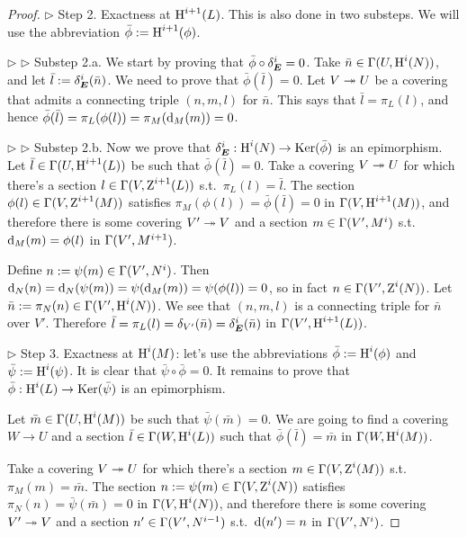 \begin{proof}
\medskip \noindent 
$\triangleright$ Step 2. Exactness at $\operatorname{H}^{i + 1}(L)$. This is also done 
in two substeps. We will use the abbreviation 
$\bar{\phi} := \operatorname{H}^{i + 1}(\phi)$. 

\medskip \noindent 
$\triangleright$  $\triangleright$  Substep 2.a.
We start by proving that 
$\bar{\phi} \circ \delta_{\boldsymbol{E}}^i  = 0$.
Take $\bar{n} \in \Gamma(U, \operatorname{H}^{i}(N))$, and let 
$\bar{l} := \delta_{\boldsymbol{E}}^i(\bar{n})$. We need to prove that 
$\bar{\phi}(\bar{l}) = 0$. 
Let $V \twoheadrightarrow U$ be a covering that admits a connecting triple $(n, m, l)$ for 
$\bar{n}$. This says that $\bar{l} = \pi_L(l)$, and hence 
$\bar{\phi}(\bar{l}) = \pi_L(\phi(l)) = \pi_M(\mathrm{d}_M(m)) = 0$.

\medskip \noindent 
$\triangleright$  $\triangleright$  Substep 2.b.
Now we prove that 
$\delta_{\boldsymbol{E}}^i : \operatorname{H}^{i}(N) \to \operatorname{Ker}(\bar{\phi})$
is an epimorphism. 
Let $\bar{l} \in \Gamma(U, \operatorname{H}^{i + 1}(L))$ be such that 
$\bar{\phi}(\bar{l}) = 0$. 
Take a covering $V \twoheadrightarrow U$ for which there's a section 
$l \in \Gamma(V, \operatorname{Z}^{i + 1}(L))$
s.t.\ $\pi_L(l) = \bar{l}$. The section 
$\phi(l) \in \Gamma(V, \operatorname{Z}^{i + 1}(M))$
satisfies 
$\pi_M(\phi(l)) = \bar{\phi}(\bar{l}) = 0$
in $\Gamma(V, \operatorname{H}^{i + 1}(M))$, and therefore there is some covering 
$V' \twoheadrightarrow V$ and a section 
$m \in \Gamma(V', M^{i})$ s.t.\ 
$\mathrm{d}_M(m) = \phi(l)$ in $\Gamma(V', M^{i + 1})$.

Define $n := \psi(m) \in \Gamma(V', N^{i})$. Then 
$\mathrm{d}_N(n) = \mathrm{d}_N(\psi(m)) = \psi(\mathrm{d}_M(m)) = \psi(\phi(l)) = 0$,
so in fact $n \in \Gamma(V', \operatorname{Z}^{i}(N))$. 
Let $\bar{n} := \pi_N(n) \in \Gamma(V', \operatorname{H}^{i}(N))$.
We see that $(n, m, l)$ is a connecting triple for $\bar{n}$ over $V'$. 
Therefore 
$\bar{l} = \pi_L(l) = \delta_{V'}(\bar{n}) = \delta_{\boldsymbol{E}}^i(\bar{n})$
in $\Gamma(V', \operatorname{H}^{i + 1}(L))$. 

\medskip \noindent 
$\triangleright$ Step 3. Exactness at $\operatorname{H}^{i}(M)$: 
let's use the abbreviations $\bar{\phi} := \operatorname{H}^{i}(\phi)$ and 
$\bar{\psi} := \operatorname{H}^{i}(\psi)$. 
It is clear that $\bar{\psi} \circ \bar{\phi} = 0$. 
It remains to prove that 
$\bar{\phi} : \operatorname{H}^{i}(L) \to \operatorname{Ker}(\bar{\psi})$
is an epimorphism. 

Let $\bar{m} \in \Gamma(U, \operatorname{H}^{i}(M))$ be such that 
$\bar{\psi}(\bar{m}) = 0$. 
We are going to find a covering $W \to U$ and a section 
$\bar{l} \in \Gamma(W, \operatorname{H}^{i}(L))$
such that $\bar{\phi}(\bar{l}) = \bar{m}$ in 
$\Gamma(W, \operatorname{H}^{i}(M))$.

Take a covering $V \twoheadrightarrow U$ for which there's a section 
$m \in \Gamma(V, \operatorname{Z}^{i}(M))$
s.t.\ $\pi_M(m) = \bar{m}$. 
The section $n := \psi(m) \in \Gamma(V, \operatorname{Z}^{i}(N))$
satisfies
$\pi_N(n) = \bar{\psi}(\bar{m}) = 0$
in $\Gamma(V, \operatorname{H}^{i}(N))$, and therefore there is some covering 
$V' \twoheadrightarrow V$ and a section 
$n' \in \Gamma(V', N^{i - 1})$ s.t.\ 
$\mathrm{d}(n') = n$ in $\Gamma(V', N^{i})$.


\end{proof}
